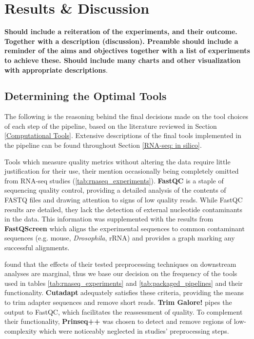 \chapter{Results \& Discussion}

\textbf{Should include a reiteration of the experiments, and their outcome.  Together with a description (discussion).  Preamble should include a reminder of the aims and objectives together with a list of experiments to achieve these.  Should include many charts and other visualization with appropriate descriptions}.  


\section{Determining the Optimal Tools}

The following is the reasoning behind the final decisions made on the tool choices of each step of the pipeline, based on the literature reviewed in Section \ref{Computational Tools}. Extensive descriptions of the final tools implemented in the pipeline can be found throughout Section \ref{RNA-seq: in silico}.

Tools which measure quality metrics without altering the data require little justification for their use, their mention occasionally being completely omitted from RNA-seq studies (\autoref{tab:rnaseq_experiments}). \textbf{FastQC} is a staple of sequencing quality control, providing a detailed analysis of the contents of FASTQ files and drawing attention to signs of low quality reads. While FastQC results are detailed, they lack the detection of external nucleotide contaminants in the data. This information was supplemented with the results from \textbf{FastQScreen} which aligns the experimental sequences to common contaminant sequences (e.g. mouse, \textit{Drosophila}, rRNA) and provides a graph marking any successful alignments.

\cite{he2020assessing} found that the effects of their tested preprocessing techniques on downstream analyses are marginal, thus we base our decision on the frequency of the tools used in tables \ref{tab:rnaseq_experiments} and \ref{tab:packaged_pipelines} and their functionality. \textbf{Cutadapt} adequately satisfies these criteria, providing the means to trim adapter sequences and remove short reads. \textbf{Trim Galore!} pipes the output to FastQC, which facilitates the reassessment of quality. To complement their functionality, \textbf{Prinseq++} was chosen to detect and remove regions of low-complexity which were noticeably neglected in studies' preprocessing steps. 


